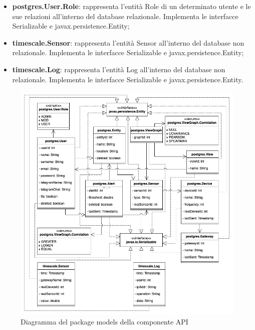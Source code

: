 \begin{itemize}
			\item \textbf{postgres.User.Role}: rappresenta l'entità Role di un determinato utente e le sue relazioni all'interno del database relazionale. Implementa le interfacce Serializable e javax.persistence.Entity;
			\item \textbf{timescale.Sensor}: rappresenta l'entità Sensor all'interno del database non relazionale. Implementa le interfacce Serializable e javax.persistence.Entity;
			\item \textbf{timescale.Log}: rappresenta l'entità Log all'interno del database non relazionale. Implementa le interfacce Serializable e javax.persistence.Entity.
		\end{itemize} 
		\newpage
		\begin{figure}[H]
			\centering
			\includegraphics[scale=0.550]{res/images/API/ModelsPackage.png}
			\caption{Diagramma del package models della componente API}
			\label{Diagramma 14}
		\end{figure}
		
